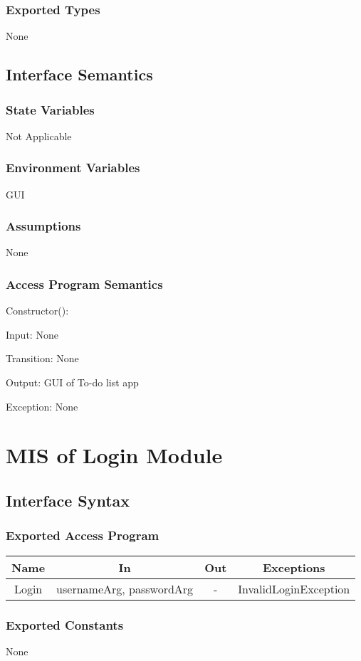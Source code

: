 \documentclass[12pt, titlepage]{article}
\begin{document}
\subsubsection{Exported Types}
None
\subsection{Interface Semantics}
\subsubsection{State Variables}
Not Applicable
\subsubsection{Environment Variables}
GUI
\subsubsection{Assumptions}
None
\subsubsection{Access Program Semantics}
Constructor():

    Input: None

    Transition: None

    Output: GUI of To-do list app

    Exception: None

\newpage



\section{MIS of Login Module}
\subsection{Interface Syntax}
\subsubsection{Exported Access Program}
\begin{tabular}[pos]{|c|c|c|c|}
    \hline
    \textbf{Name}& \textbf{In} & \textbf{Out} & \textbf{Exceptions} \\ \hline
    Login & usernameArg, passwordArg & - & InvalidLoginException \\ \hline
\end{tabular}
\subsubsection{Exported Constants}
None
\end{document}
